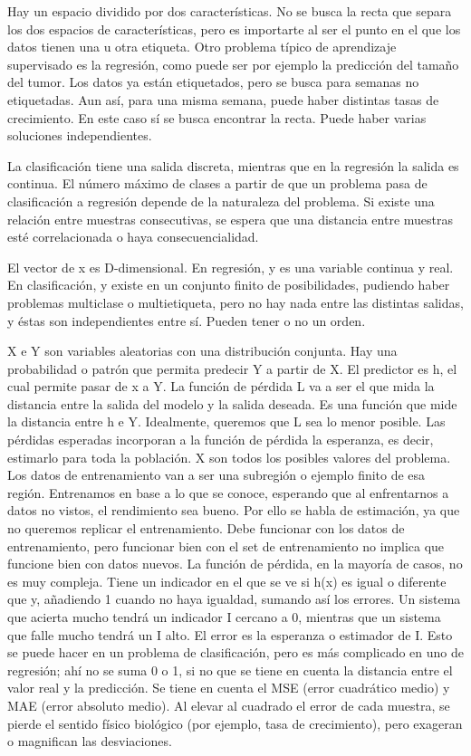 Hay un espacio dividido por dos características. No se busca la recta que separa los dos espacios de características, pero es importarte al ser el punto en el que los datos tienen una u otra etiqueta. Otro problema típico de aprendizaje supervisado es la regresión, como puede ser por ejemplo la predicción del tamaño del tumor. Los datos ya están etiquetados, pero se busca para semanas no etiquetadas. Aun así, para una misma semana, puede haber distintas tasas de crecimiento. En este caso sí se busca encontrar la recta. Puede haber varias soluciones independientes.

La clasificación tiene una salida discreta, mientras que en la regresión la salida es continua. El número máximo de clases a partir de que un problema pasa de clasificación a regresión depende de la naturaleza del problema. Si existe una relación entre muestras consecutivas, se espera que una distancia entre muestras esté correlacionada o haya consecuencialidad. 

El vector de x es D-dimensional. En regresión, y es una variable continua y real. En clasificación, y existe en un conjunto finito de posibilidades, pudiendo haber problemas multiclase o multietiqueta, pero no hay nada entre las distintas salidas, y éstas son independientes entre sí. Pueden tener o no un orden.

X e Y son variables aleatorias con una distribución conjunta. Hay una probabilidad o patrón que permita predecir Y a partir de X. El predictor es h, el cual permite pasar de x a Y. La función de pérdida L va a ser el que mida la distancia entre la salida del modelo y la salida deseada. Es una función que mide la distancia entre h e Y. Idealmente, queremos que L sea lo menor posible. Las pérdidas esperadas incorporan a la función de pérdida la esperanza, es decir, estimarlo para toda la población. X son todos los posibles valores del problema. Los datos de entrenamiento van a ser una subregión o ejemplo finito de esa región. Entrenamos en base a lo que se conoce, esperando que al enfrentarnos a datos no vistos, el rendimiento sea bueno. Por ello se habla de estimación, ya que no queremos replicar el entrenamiento. Debe funcionar con los datos de entrenamiento, pero funcionar bien con el set de entrenamiento no implica que funcione bien con datos nuevos. La función de pérdida, en la mayoría de casos, no es muy compleja. Tiene un indicador en el que se ve si h(x) es igual o diferente que y, añadiendo 1 cuando no haya igualdad, sumando así los errores. Un sistema que acierta mucho tendrá un indicador I cercano a 0, mientras que un sistema que falle mucho tendrá un I alto. El error es la esperanza o estimador de I. Esto se puede hacer en un problema de clasificación, pero es más complicado en uno de regresión; ahí no se suma 0 o 1, si no que se tiene en cuenta la distancia entre el valor real y la predicción. Se tiene en cuenta el MSE (error cuadrático medio) y MAE (error absoluto medio). Al elevar al cuadrado el error de cada muestra, se pierde el sentido físico biológico (por ejemplo, tasa de crecimiento), pero exageran o magnifican las desviaciones. 

